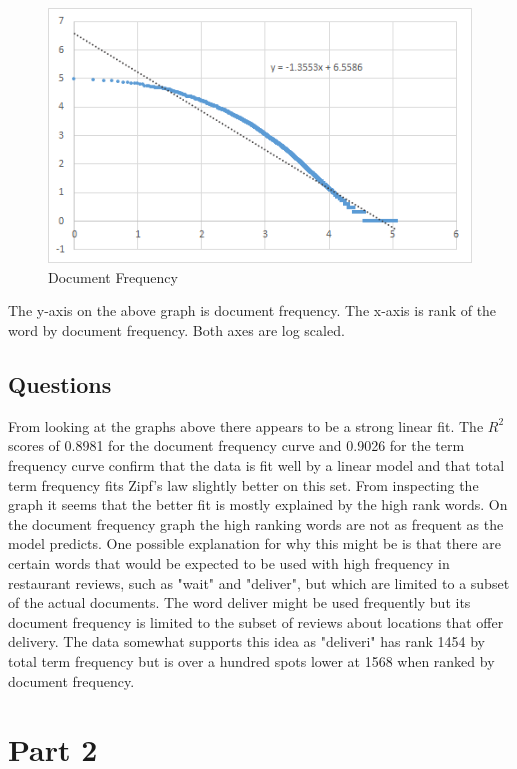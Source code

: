 \documentclass[paper=a4, fontsize=11pt]{jhwhw} %
\begin{document}
\begin{figure}[h!]
    \caption{Document Frequency}
    \includegraphics{dfoutgraph}
\end{figure}
The y-axis on the above graph is document frequency. The x-axis is rank of the word by document frequency. Both axes are log scaled.
\subsection{Questions}
From looking at the graphs above there appears to be a strong linear fit. The $R^2$ scores of 0.8981 for the document frequency curve and 0.9026 for the term frequency curve confirm that the data is fit well by a linear model and that total term frequency fits Zipf's law slightly better on this set. From inspecting the graph it seems that the better fit is mostly explained by the high rank words. On the document frequency graph the high ranking words are not as frequent as the model predicts. One possible explanation for why this might be is that there are certain words that would be expected to be used with high frequency in restaurant reviews, such as "wait" and "deliver", but which are limited to a subset of the actual documents. The word deliver might be used frequently but its document frequency is limited to the subset of reviews about locations that offer delivery. The data somewhat supports this idea as "deliveri" has rank 1454 by total term frequency but is over a hundred spots lower at 1568 when ranked by document frequency.  

\section{Part 2}
\end{document}
